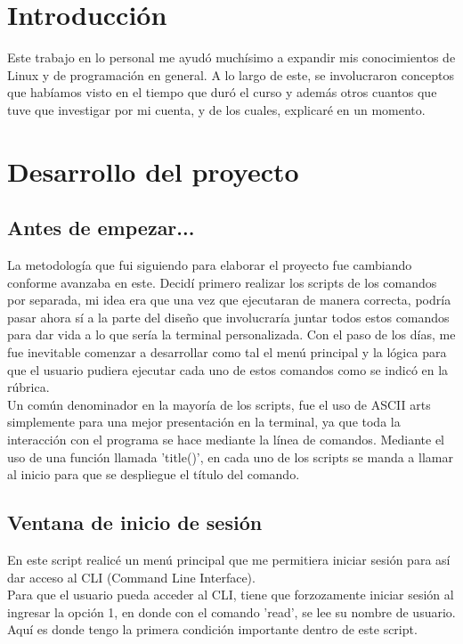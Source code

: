 \documentclass[letter,11pt]{article}
\begin{document}
\newpage

\section{Introducción}
Este trabajo en lo personal me ayudó muchísimo a expandir mis conocimientos de Linux y de programación en general.
A lo largo de este, se involucraron conceptos que habíamos visto en el tiempo que duró el curso y además otros cuantos
que tuve que investigar por mi cuenta, y de los cuales, explicaré en un momento.\\

\newpage

\section{Desarrollo del proyecto}

\subsection{Antes de empezar...}
La metodología que fui siguiendo para elaborar el proyecto fue cambiando conforme avanzaba en este. Decidí primero
realizar los scripts de los comandos por separada, mi idea era que una vez que ejecutaran de manera correcta, podría pasar ahora sí a la parte del diseño que involucraría juntar todos estos comandos para dar vida a lo que sería la terminal
personalizada. Con el paso de los días, me fue inevitable comenzar a desarrollar como tal el menú principal y la lógica
para que el usuario pudiera ejecutar cada uno de estos comandos como se indicó en la rúbrica.\\

Un común denominador en la mayoría de los scripts, fue el uso de ASCII arts simplemente para una mejor presentación
en la terminal, ya que toda la interacción con el programa se hace mediante la línea de comandos. Mediante el uso de una función llamada 'title()', en cada uno de los scripts se manda a llamar al inicio para que se despliegue el título
del comando.

\subsection{Ventana de inicio de sesión}
En este script realicé un menú principal que me permitiera iniciar sesión para así dar acceso al CLI (Command Line Interface). \\
Para que el usuario pueda acceder al CLI, tiene que forzozamente iniciar sesión al ingresar la opción 1, en donde con el comando 'read', se lee su nombre de usuario. Aquí es donde tengo la primera condición importante dentro de este script.\\
\end{document}
